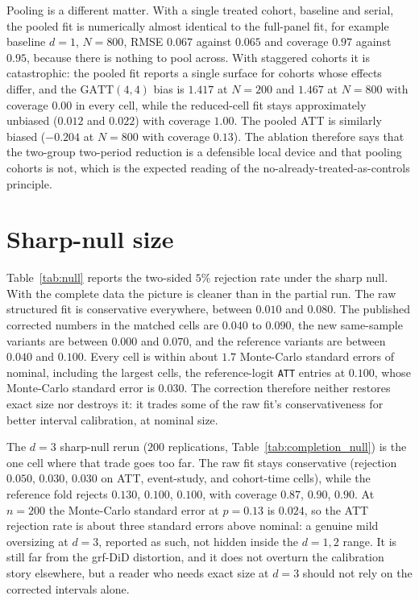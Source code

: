 \documentclass[11pt]{article}
\begin{document}
Pooling is a different matter. With a single treated cohort, baseline and serial, the
pooled fit is numerically almost identical to the full-panel fit, for example baseline
$d=1$, $N=800$, RMSE $0.067$ against $0.065$ and coverage $0.97$ against $0.95$, because
there is nothing to pool across. With staggered cohorts it is catastrophic: the pooled
fit reports a single surface for cohorts whose effects differ, and the
$\mathrm{GATT}(4,4)$ bias is $1.417$ at $N=200$ and $1.467$ at $N=800$ with coverage
$0.00$ in every cell, while the reduced-cell fit stays approximately unbiased
($0.012$ and $0.022$) with coverage $1.00$. The pooled ATT is similarly biased
($-0.204$ at $N=800$ with coverage $0.13$). The ablation therefore says that the
two-group two-period reduction is a defensible local device and that pooling cohorts is
not, which is the expected reading of the no-already-treated-as-controls principle.

\section{Sharp-null size}
\label{sec:null}

Table~\ref{tab:null} reports the two-sided $5\%$ rejection rate under the sharp null.
With the complete data the picture is cleaner than in the partial run. The raw
structured fit is conservative everywhere, between $0.010$ and $0.080$. The published
corrected numbers in the matched cells are $0.040$ to $0.090$, the new same-sample
variants are between $0.000$ and $0.070$, and the reference variants are between $0.040$
and $0.100$. Every cell is within about $1.7$ Monte-Carlo standard errors of nominal,
including the largest cells, the reference-logit \texttt{ATT} entries at $0.100$, whose
Monte-Carlo standard error is $0.030$. The correction therefore neither restores exact
size nor destroys it: it trades some of the raw fit's conservativeness for better
interval calibration, at nominal size.

The $d=3$ sharp-null rerun ($200$ replications, Table~\ref{tab:completion_null})
is the one cell where that trade goes too far. The raw fit stays conservative
(rejection $0.050$, $0.030$, $0.030$ on ATT, event-study, and cohort-time cells),
while the reference fold rejects $0.130$, $0.100$, $0.100$, with coverage $0.87$,
$0.90$, $0.90$. At $n=200$ the Monte-Carlo standard error at $p=0.13$ is $0.024$,
so the ATT rejection rate is about three standard errors above nominal: a genuine
mild oversizing at $d=3$, reported as such, not hidden inside the $d=1,2$ range.
It is still far from the grf-DiD distortion, and it does not overturn the
calibration story elsewhere, but a reader who needs exact size at $d=3$ should
not rely on the corrected intervals alone.
\end{document}
